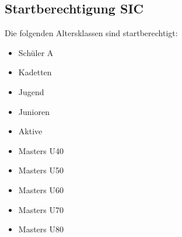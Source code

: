 \subsection{Startberechtigung SIC}
Die folgenden Altersklassen sind startberechtigt:
\begin{itemize}
	\item Schüler A
	\item Kadetten
	\item Jugend
	\item Junioren
	\item Aktive
	\item Masters U40
	\item Masters U50
	\item Masters U60
	\item Masters U70
	\item Masters U80
\end{itemize}